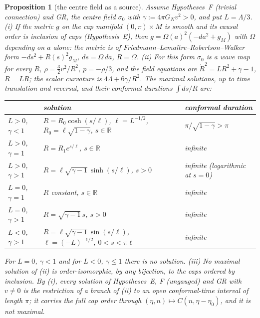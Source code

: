 \documentclass[aps,pra,onecolumn,superscriptaddress,nofootinbib,10pt]{revtex4-2}
\newtheorem{proposition}[theorem]{Proposition}
\theoremstyle{definition}
\theoremstyle{remark}
\newcommand{\R}{\mathbb{R}}
\begin{document}
\begin{proposition}[the centre field as a source]\label{prop:friedmann}
Assume Hypotheses~F (trivial connection) and GR, the centre field $\sigma_0$ with $\gamma:=4\pi G_Nv^2>0$, and
put $L=\Lambda/3$.
(i) If the metric $g$ on the cap manifold $(0,\pi)\times M$ is smooth and its causal order is inclusion of caps
(Hypothesis~E), then $g=\Omega(a)^2(-da^2+g_M)$ with $\Omega$ depending on $a$ alone: the metric is of
Friedmann--Lema\^itre--Robertson--Walker form $-ds^2+R(s)^2g_M$, $ds=\Omega\,da$, $R=\Omega$.
(ii) For this form $\sigma_0$ is a wave map for every $R$, $\rho=\tfrac32v^2/R^2$, $p=-\rho/3$, and the field
equations are $\dot R^2=LR^2+\gamma-1$, $\ddot R=LR$; the scalar curvature is $4\Lambda+6\gamma/R^2$.  The maximal
solutions, up to time translation and reversal, and their conformal durations $\int ds/R$ are:
\begin{center}\footnotesize
\begin{tabular}{@{}lll@{}}
\toprule
& solution & conformal duration\\
\midrule
$L>0$, $\gamma<1$ & $R=R_0\cosh(s/\ell)$, $\ell=L^{-1/2}$, $R_0=\ell\sqrt{1-\gamma}$, $s\in\R$ & $\pi/\sqrt{1-\gamma}>\pi$\\
$L>0$, $\gamma=1$ & $R=R_1e^{s/\ell}$, $s\in\R$ & infinite\\
$L>0$, $\gamma>1$ & $R=\ell\sqrt{\gamma-1}\,\sinh(s/\ell)$, $s>0$ & infinite (logarithmic at $s=0$)\\
$L=0$, $\gamma=1$ & $R$ constant, $s\in\R$ & infinite\\
$L=0$, $\gamma>1$ & $R=\sqrt{\gamma-1}\,s$, $s>0$ & infinite\\
$L<0$, $\gamma>1$ & $R=\ell\sqrt{\gamma-1}\,\sin(s/\ell)$, $\ell=(-L)^{-1/2}$, $0<s<\pi\ell$ & infinite\\
\bottomrule
\end{tabular}
\end{center}
For $L=0$, $\gamma<1$ and for $L<0$, $\gamma\le1$ there is no solution.
(iii) No maximal solution of (ii) is order-isomorphic, by any bijection, to the caps ordered by
inclusion.  By (i), every solution of Hypotheses~E, F (ungauged) and GR with $v\ne0$ is the restriction of a
branch of (ii) to an open conformal-time interval of length $\pi$; it carries the full cap order through
$(\eta,n)\mapsto C(n,\eta-\eta_0)$, and it is not maximal.
\end{proposition}
\end{document}
